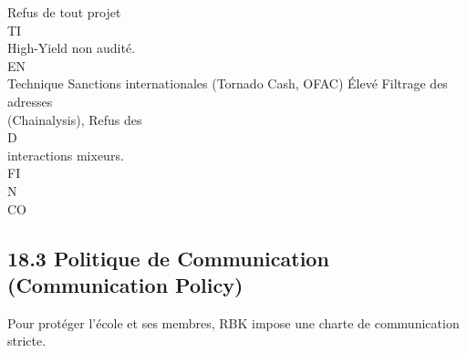 Refus de tout projet\\
\vspace{0.5em}
\vspace{0.5em}
\vspace{0.5em}
\vspace{0.5em}
TI\\
High-Yield non audité.\\
\vspace{0.5em}
\vspace{0.5em}
\vspace{0.5em}
\vspace{0.5em}
EN\\
Technique     Sanctions internationales (Tornado Cash, OFAC)                    Élevé   Filtrage des adresses\\
(Chainalysis), Refus des\\
\vspace{0.5em}
\vspace{0.5em}
\vspace{0.5em}
\vspace{0.5em}
D\\
interactions mixeurs.\\
\vspace{0.5em}
\vspace{0.5em}
\vspace{0.5em}
\vspace{0.5em}
FI\\
N\\
CO\\
\subsection{18.3 Politique de Communication (Communication Policy)}
Pour protéger l’école et ses membres, RBK impose une charte de communication stricte.\\
\vspace{0.5em}
\vspace{0.5em}

